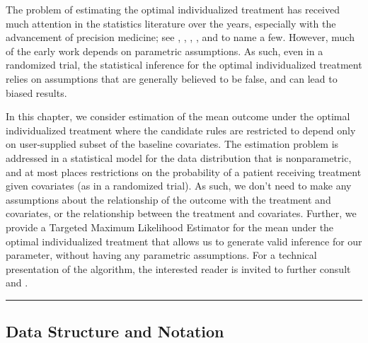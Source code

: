 \documentclass[12pt, krantz2,]{krantz}
\theoremstyle{definition}
\theoremstyle{definition}
\theoremstyle{definition}
\newcommand{\1}{\mathbbm{1}}
\begin{document}
The problem of estimating the optimal individualized treatment has received much
attention in the statistics literature over the years, especially with the
advancement of precision medicine; see \citet{murphy2003}, \citet{robins2004}, \citet{laber2012},
\citet{kosorok2012}, \citet{moodie2013} and \citet{robins2014} to name a few. However, much of the
early work depends on parametric assumptions. As such, even in a randomized
trial, the statistical inference for the optimal individualized treatment relies
on assumptions that are generally believed to be false, and can lead to biased
results.

In this chapter, we consider estimation of the mean outcome under the optimal
individualized treatment where the candidate rules are restricted to depend only
on user-supplied subset of the baseline covariates. The estimation problem is
addressed in a statistical model for the data distribution that is
nonparametric, and at most places restrictions on the probability of a patient
receiving treatment given covariates (as in a randomized trial). As such, we
don't need to make any assumptions about the relationship of the outcome with
the treatment and covariates, or the relationship between the treatment and
covariates. Further, we provide a Targeted Maximum Likelihood Estimator for the
mean under the optimal individualized treatment that allows us to generate valid
inference for our parameter, without having any parametric assumptions. For a
technical presentation of the algorithm, the interested reader is invited to
further consult \citet{vanderLaanLuedtke15} and \citet{luedtke2016super}.

\begin{center}\rule{0.5\linewidth}{0.5pt}\end{center}

\hypertarget{data-structure-and-notation}{%
\subsection{Data Structure and Notation}\label{data-structure-and-notation}}
\end{document}
